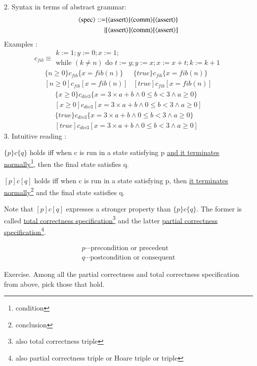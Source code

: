 \documentclass{report}[12pt]
\begin{document}
2. Syntax in terms of abstract grammar:
\begin{align*}
    \langle \text{spec}\rangle ::= &\{\langle \text{assert}\rangle\} \langle \text{comm}\rangle \{\langle \text{assert}\rangle\} \\
    | &[\langle \text{assert}\rangle] \langle \text{comm}\rangle [\langle \text{assert}\rangle]
\end{align*}
Examples :
\[c_{fib} \equiv \begin{matrix}
    k:=1;y:=0;x:=1;\\\text{while }(k\neq n) \text{ do }t:=y;y:=x;x:=x+t;k:=k+1
\end{matrix}\]
\begin{align*}
    \{n \ge 0\} c_{fib} \{x=fib(n)\} & \{true\} c_{fib} \{x=fib(n)\} \\
    [n \ge 0] c_{fib} [x=fib(n)] & [true] c_{fib} [x=fib(n)]
\end{align*}
\begin{align*}
    \{x \ge 0\} c_{div3} \{x=3\times a + b \wedge 0\le b < 3 \wedge a \ge 0\} \\
    [x \ge 0] c_{div3} [x=3\times a + b \wedge 0\le b < 3 \wedge a \ge 0] \\
    \{true\} c_{div3} \{x=3\times a + b \wedge 0\le b < 3 \wedge a \ge 0\} \\
    [true] c_{div3} [x=3\times a + b \wedge 0\le b < 3 \wedge a \ge 0]
\end{align*}
3. Intuitive reading :

$\{p\}c\{q\}$ holds iff when c is run in a state satisfying p \underline{and it terminates normally}\footnote{condition}, then the final state satisfies q.

$[p]c[q]$ holds iff when c is run in a state satisfying p, then \underline{it terminates normally}\footnote{conclusion} and the final state satisfies q.

Note that $[p]c[q]$ expresses a stronger property than $\{p\}c\{q\}$. The former is called \underline{total correctness specification}\footnote{also total correctness triple} and the latter \underline{partial correctness specification}\footnote{also partial correctness triple or Hoare triple or triple}.

\begin{align*}
    p \cdots \text{precondition or precedent}\\
    q \cdots \text{postcondition or consequent}
\end{align*}

Exercise. Among all the partial correctness and total correctness specification from above, pick those that hold.
\end{document}
